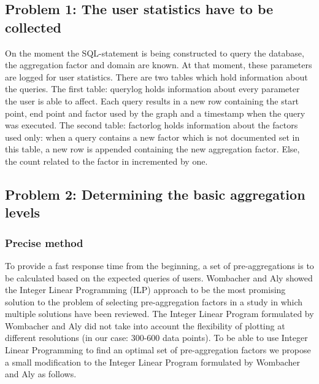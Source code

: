 \subsection{Problem 1: The user statistics have to be collected}
On the moment the SQL-statement is being constructed to query the database, the aggregation factor and domain are known. At that moment, these parameters are logged for user statistics.
There are two tables which hold information about the queries. The first table: querylog holds information about every parameter the user is able to affect. Each query results in a new row containing the start point, end point and factor used by the graph and a timestamp when the query was executed. The second table: factorlog holds information about the factors used only: when a query contains a new factor which is not documented set in this table, a new row is appended containing the new aggregation factor. Else, the count related to the factor in incremented by one.\\

\subsection{Problem 2: Determining the basic aggregation levels}
\subsubsection{Precise method}
To provide a fast response time from the beginning, a set of pre-aggregations is to be calculated based on the expected queries of users. Wombacher and Aly \cite{wombacher2011} showed the Integer Linear Programming (ILP) approach to be the most promising solution to the problem of selecting pre-aggregation factors in a study in which multiple solutions have been reviewed. The Integer Linear Program formulated by Wombacher and Aly \cite{wombacher2011} did not take into account the flexibility of plotting at different resolutions (in our case: 300-600 data points). To be able to use Integer Linear Programming to find an optimal set of pre-aggregation factors we propose a small modification to the Integer Linear Program formulated by Wombacher and Aly \cite{wombacher2011} as follows.
